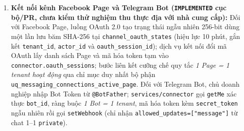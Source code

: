 \begin{enumerate}
    Về phần thiết kế mở rộng (\texttt{TARGET}, theo đặc tả \texttt{2026-\hspace{0pt}10-\hspace{0pt}23\_\hspace{0pt}owner-\hspace{0pt}overview\_\hspace{0pt}design.\hspace{0pt}md} chưa hợp nhất vào bộ định tuyến hiện tại), API tổng quan \texttt{GET} trên đường dẫn \texttt{/tenants/\hspace{0pt}\{tenantID\}/\hspace{0pt}overview} cung cấp góc nhìn chỉ đọc cho \texttt{owner} trong một giao dịch \texttt{REPEATABLE READ}, tách riêng hai tập hợp đơn hàng và công việc theo khoảng thời gian tạo, đọc nhãn bước từ phiên bản đã gắn và không gọi tổng giá trị đơn là doanh thu thực thu.
  \item \textbf{Kết nối kênh Facebook Page và Telegram Bot (\texttt{IMPLEMENTED} cục bộ/PR, chưa kiểm thử nghiệm thu thực địa với nhà cung cấp):} Đối với Facebook Page, luồng OAuth 2.0 tạo trạng thái ngẫu nhiên 256-bit dùng một lần lưu băm SHA-256 tại \texttt{channel\_\hspace{0pt}oauth\_\hspace{0pt}states} (hiệu lực 10 phút, gắn kết \texttt{tenant\_\hspace{0pt}id}, \texttt{actor\_\hspace{0pt}id} và \texttt{oauth\_\hspace{0pt}session\_\hspace{0pt}id}); dịch vụ kết nối đổi mã OAuth lấy danh sách Page và mã hóa token tạm vào \texttt{connector.\hspace{0pt}oauth\_\hspace{0pt}sessions}; bước liên kết cưỡng chế quy tắc \emph{1 Page = 1 tenant hoạt động} qua chỉ mục duy nhất bộ phận \texttt{uq\_\hspace{0pt}messaging\_\hspace{0pt}connections\_\hspace{0pt}active\_\hspace{0pt}page}.
    Đối với Telegram Bot, chủ doanh nghiệp nhập Bot Token từ \texttt{@BotFather}; \texttt{services/\hspace{0pt}connector} gọi \texttt{getMe} xác thực \texttt{bot\_\hspace{0pt}id}, ràng buộc \emph{1 Bot = 1 tenant}, mã hóa token kèm \texttt{secret\_\hspace{0pt}token} ngẫu nhiên rồi gọi \texttt{setWebhook} (chỉ nhận \texttt{allowed\_\hspace{0pt}updates=["message"]} từ chat 1--1 \texttt{private}).

\end{enumerate}
